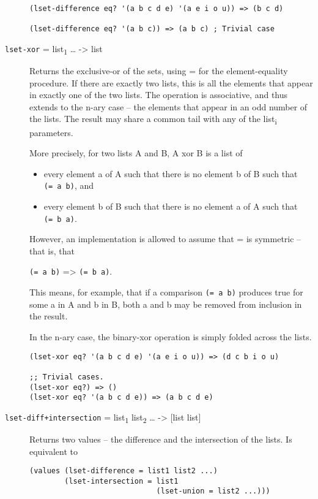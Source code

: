 \begin{description}
\begin{verbatim}
(lset-difference eq? '(a b c d e) '(a e i o u)) => (b c d)

(lset-difference eq? '(a b c)) => (a b c) ; Trivial case
\end{verbatim}
\item[ \href{}{} \texttt{lset-xor} = list\textsubscript{1} \ldots{}
-\textgreater{} list ]
Returns the exclusive-or of the sets, using = for the element-equality
procedure. If there are exactly two lists, this is all the elements that
appear in exactly one of the two lists. The operation is associative,
and thus extends to the n-ary case -- the elements that appear in an odd
number of the lists. The result may share a common tail with any of the
list\textsubscript{i} parameters.

More precisely, for two lists A and B, A xor B is a list of

\begin{itemize}
\tightlist
\item
  every element a of A such that there is no element b of B such that
  \texttt{(=\ a\ b)}, and
\item
  every element b of B such that there is no element a of A such that
  \texttt{(=\ b\ a)}.
\end{itemize}

However, an implementation is allowed to assume that = is symmetric --
that is, that

\texttt{(=\ a\ b)} =\textgreater{} \texttt{(=\ b\ a)}.

This means, for example, that if a comparison \texttt{(=\ a\ b)}
produces true for some a in A and b in B, both a and b may be removed
from inclusion in the result.

In the n-ary case, the binary-xor operation is simply folded across the
lists.

\begin{verbatim}
(lset-xor eq? '(a b c d e) '(a e i o u)) => (d c b i o u)

;; Trivial cases.
(lset-xor eq?) => ()
(lset-xor eq? '(a b c d e)) => (a b c d e)
\end{verbatim}
\item[ \href{}{} \texttt{lset-diff+intersection} = list\textsubscript{1}
list\textsubscript{2} \ldots{} -\textgreater{} {[}list list{]} ]
Returns two values -- the difference and the intersection of the lists.
Is equivalent to

\begin{verbatim}
(values (lset-difference = list1 list2 ...)
        (lset-intersection = list1
                             (lset-union = list2 ...)))
\end{verbatim}


\end{description}
